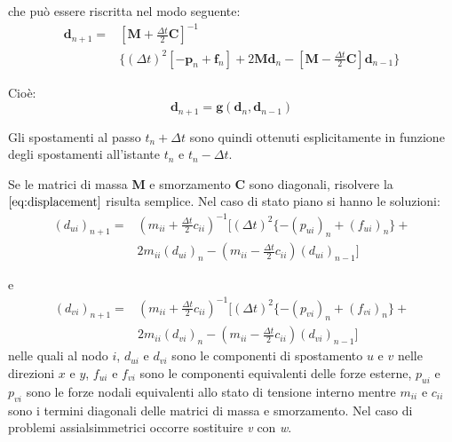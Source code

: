 che può essere riscritta nel modo seguente:
\begin{equation}
	\begin{split}
	\boldsymbol{d}_{n+1} = & [\boldsymbol{M} + \frac{\varDelta t}{2} \boldsymbol{C}]^{-1} \\
	                       & \{ (\varDelta t)^2 [- \boldsymbol{p}_n + \boldsymbol{f}_n ] +
	2 \boldsymbol{M} \boldsymbol{d}_n - [\boldsymbol{M} - \frac{\varDelta t}{2} \boldsymbol{C}] \boldsymbol{d}_{n-1} \}
	\end{split}
\end{equation}

Cioè:
\begin{equation}
	\boldsymbol{d}_{n+1} = \boldsymbol{g}(\boldsymbol{d}_{n}, \boldsymbol{d}_{n-1})
	\label{eq:displacement}
\end{equation}

Gli spostamenti al passo $t_n + \varDelta t$ sono quindi ottenuti esplicitamente in funzione 
degli spostamenti all'istante $t_n$ e $t_n - \varDelta t$.

Se le matrici di massa \textbf{M} e smorzamento $\textbf{C}$ sono diagonali, risolvere la 
$\ref{eq:displacement}$ risulta semplice. Nel caso di stato piano si hanno le soluzioni:
\begin{equation} 
	\begin{split}
		(d_{ui})_{n+1} = & (m_{ii} + \frac{\varDelta t}{2} c_{ii})^{-1} [(\varDelta t)^2 \{ - (p_{ui})_n + (f_{ui})_n \} + \\ 
		&2 m_{ii} (d_{ui})_n - (m_{ii} - \frac{\varDelta t}{2} c_{ii}) (d_{ui})_{n-1}]
	\end{split}
	\label{eq:dispx} 
\end{equation}

e
\begin{equation} 
	\begin{split}
		(d_{vi})_{n+1} = & (m_{ii} + \frac{\varDelta t}{2} c_{ii})^{-1} [(\varDelta t)^2 \{ - (p_{vi})_n + (f_{vi})_n \} + \\ 
		&2 m_{ii} (d_{vi})_n - (m_{ii} - \frac{\varDelta t}{2} c_{ii}) (d_{vi})_{n-1} ]
	\end{split} 
\end{equation}
nelle quali al nodo $i$, $d_{ui}$ e $d_{vi}$ sono le componenti di spostamento $\textit{u}$ 
e $\textit{v}$ nelle direzioni $\textit{x}$ e $\textit{y}$, $f_{ui}$ e $f_{vi}$ sono 
le componenti equivalenti delle forze esterne,  $p_{ui}$ e $p_{vi}$ sono le forze nodali
equivalenti allo stato di tensione interno mentre $m_{ii}$ e $c_{ii}$ sono i termini diagonali
delle matrici di massa e smorzamento. Nel caso di problemi assialsimmetrici 
occorre sostituire \textit{v} con \textit{w}.

